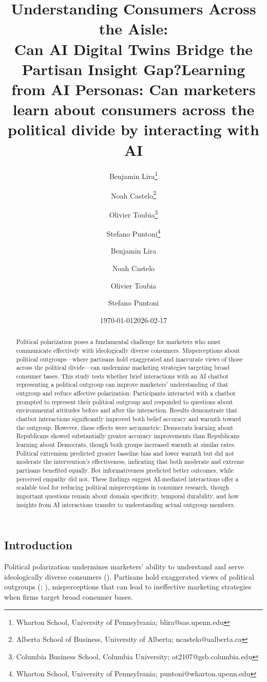 \documentclass[
  11pt,
  oneside]{article}
\title{Understanding Consumers Across the Aisle: \\
Can AI Digital Twins Bridge the Partisan Insight Gap?}
\author{
  Benjamin Lira\thanks{Wharton School, University of Pennsylvania; blira@sas.upenn.edu} \and
  Noah Castelo\thanks{Alberta School of Business, University of Alberta; ncastelo@ualberta.ca} \and
  Olivier Toubia\thanks{Columbia Business School, Columbia University; ot2107@gsb.columbia.edu} \and
  Stefano Puntoni\thanks{Wharton School, University of Pennsylvania; puntoni@wharton.upenn.edu}
}
\date{\today}
\title{Learning from AI Personas: Can marketers learn about consumers
across the political divide by interacting with AI}
\author{Benjamin Lira \and Noah Castelo \and Olivier Toubia \and Stefano
Puntoni}
\date{2026-02-17}
\begin{document}
\maketitle
\begin{abstract}
Political polarization poses a fundamental challenge for marketers who
must communicate effectively with ideologically diverse consumers.
Misperceptions about political outgroups---where partisans hold
exaggerated and inaccurate views of those across the political
divide---can undermine marketing strategies targeting broad consumer
bases. This study tests whether brief interactions with an AI chatbot
representing a political outgroup can improve marketers' understanding
of that outgroup and reduce affective polarization. Participants
interacted with a chatbot prompted to represent their political outgroup
and responded to questions about environmental attitudes before and
after the interaction. Results demonstrate that chatbot interactions
significantly improved both belief accuracy and warmth toward the
outgroup. However, these effects were asymmetric: Democrats learning
about Republicans showed substantially greater accuracy improvements
than Republicans learning about Democrats, though both groups increased
warmth at similar rates. Political extremism predicted greater baseline
bias and lower warmth but did not moderate the intervention's
effectiveness, indicating that both moderate and extreme partisans
benefited equally. Bot informativeness predicted better outcomes, while
perceived empathy did not. These findings suggest AI-mediated
interactions offer a scalable tool for reducing political misperceptions
in consumer research, though important questions remain about domain
specificity, temporal durability, and how insights from AI interactions
transfer to understanding actual outgroup members.
\end{abstract}


\subsection{Introduction}\label{introduction}

Political polarization undermines marketers' ability to understand and
serve ideologically diverse consumers
(). Partisans hold
exaggerated views of political outgroups
(;
),
misperceptions that can lead to ineffective marketing strategies when
firms target broad consumer bases.
\end{document}
